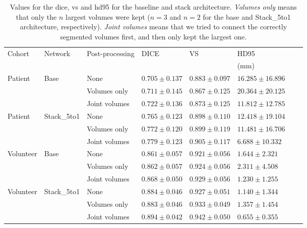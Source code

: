\begin{table}[htbp]
   \centering
   \caption[Segmentation Evaluation Metrics for the different Architectures]{Values for the \acrlong{dice}, \acrlong{vs} and \acrlong{hd95} for the baseline and stack architecture. \textit{Volumes only} means that only the $n$ largest volumes were kept ($n = 3$ and $n = 2$ for the base and Stack\_5to1 architecture, respectively). \textit{Joint volumes} means that we tried to connect the correctly segmented volumes first, and then only kept the largest one.}
   \begin{tabular}{l*{7}{l}}
      \toprule
      Cohort	& Network	& Post-processing	& DICE				& VS				& HD95\\
      			&					&					&					&					& (mm)\\
      \midrule
      Patient   & Base 	& None & $0.705 \pm 0.137$ & $\mathbf{0.883 \pm 0.097}$ & $16.285 \pm 16.896$\\
                &                	& Volumes only  & $0.711 \pm 0.145$ & $0.867 \pm 0.125$ & $20.364 \pm 20.125$\\
                &                	& Joint volumes & $\mathbf{0.722 \pm 0.136}$ & $0.873 \pm 0.125$ & $\mathbf{11.812 \pm 12.785}$\\
      \midrule
      Patient   & Stack\_5to1 	& None & $0.765 \pm 0.123$ & $0.898 \pm 0.110$ & $12.418 \pm 19.104$\\
                &                	& Volumes only  & $0.772 \pm 0.120$ & $0.899 \pm 0.119$ & $11.481 \pm 16.706$\\
                &                	& Joint volumes      & $\mathbf{0.779 \pm 0.123}$ & $\mathbf{0.905 \pm 0.117}$ & $\mathbf{6.688  \pm 10.332}$\\
      \midrule
      Volunteer & Base 	& None & $0.861 \pm 0.057$ & $0.921 \pm 0.056$ & $1.644  \pm 2.321 $\\
                &                	& Volumes only  & $0.862 \pm 0.057$ & $0.924 \pm 0.056$ & $2.311  \pm 4.508 $\\
                &                	& Joint volumes      & $\mathbf{0.868 \pm 0.050}$ & $\mathbf{0.929 \pm 0.056}$ & $\mathbf{1.230  \pm 1.255}$\\
      \midrule
      Volunteer & Stack\_5to1 	& None & $0.884 \pm 0.046$ & $0.927 \pm 0.051$ & $1.140  \pm 1.344 $\\
                &                	& Volumes only  & $0.883 \pm 0.046$ & $0.933 \pm 0.049$ & $1.357  \pm 1.454 $\\
                &                	& Joint volumes      & $\mathbf{0.894 \pm 0.042}$ & $\mathbf{0.942 \pm 0.050}$ & $\mathbf{0.655  \pm 0.355}$\\
      \bottomrule
   \end{tabular}
   \label{tab:results_pp_small}
\end{table}

